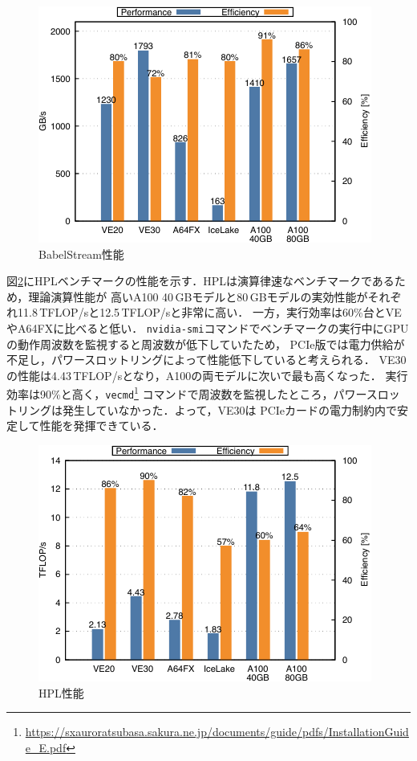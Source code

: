 ﻿\documentclass[submit,techrep,noauthor]{ipsj}
\begin{document}
\begin{figure}[tb]
  \centering
  \includegraphics{figs/stream.pdf}
  \caption{BabelStream性能~\cite{Takahashi2023}}\label{fig:stream}
\end{figure}

図\ref{fig:hpl}にHPLベンチマークの性能を示す．HPLは演算律速なベンチマークであるため，理論演算性能が
高いA100 40\,GBモデルと80\,GBモデルの実効性能がそれぞれ11.8\,TFLOP/sと12.5\,TFLOP/sと非常に高い．
一方，実行効率は60\%台とVEやA64FXに比べると低い．
\verb|nvidia-smi|コマンドでベンチマークの実行中にGPUの動作周波数を監視すると周波数が低下していたため，
PCIe版では電力供給が不足し，パワースロットリングによって性能低下していると考えられる．
VE30の性能は4.43\,TFLOP/sとなり，A100の両モデルに次いで最も高くなった．
実行効率は90\%と高く，\verb|vecmd|\footnote{\url{https://sxauroratsubasa.sakura.ne.jp/documents/guide/pdfs/InstallationGuide_E.pdf}}
コマンドで周波数を監視したところ，パワースロットリングは発生していなかった．よって，VE30は
PCIeカードの電力制約内で安定して性能を発揮できている．

\begin{figure}[tb]
  \centering
  \includegraphics{figs/hpl.pdf}
  \caption{HPL性能~\cite{Takahashi2023}}\label{fig:hpl}
\end{figure}
\end{document}
